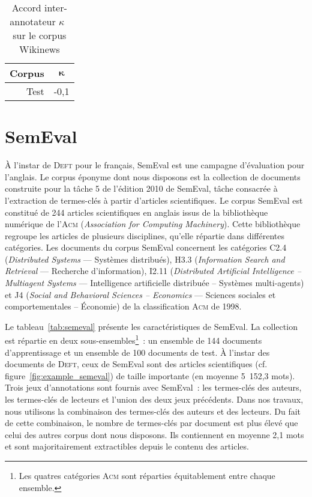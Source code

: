     \begin{table}[!h]
      \centering
      \begin{tabular}{r|c}
        \toprule
        \textbf{Corpus} & $\boldsymbol{\kappa}$\\
        \hline
        Test & -0,1\\
        \bottomrule
      \end{tabular}

      \caption{Accord inter-annotateur $\kappa$~\cite{fleiss1971kappa} sur le
               corpus Wikinews
               \label{tab:wikinews_kappa}}
    \end{table}


  \section[SemEval]{SemEval~\textnormal{\large\cite{kim2010semeval}}}
  \label{sec:main-data_description-semeval_data}
    À l'instar de \textsc{Deft} pour le français, SemEval est une campagne
    d'évaluation pour l'anglais. Le corpus éponyme dont nous disposons est la
    collection de documents construite pour la tâche 5 de l'édition 2010 de
    SemEval, tâche consacrée à l'extraction de termes-clés à partir d'articles
    scientifiques. Le corpus SemEval est constitué de 244 articles scientifiques
    en anglais issus de la bibliothèque numérique de l'\textsc{Acm}
    (\textit{Association for Computing Machinery}). Cette bibliothèque regroupe
    les articles de plusieurs disciplines, qu'elle répartie dans différentes
    catégories. Les documents du corpus SemEval concernent les catégories C2.4
    (\textit{Distributed Systems} --- Systèmes distribués), H3.3
    (\textit{Information Search and Retrieval} --- Recherche d'information),
    I2.11 (\textit{Distributed Artificial Intelligence -- Multiagent Systems}
    --- Intelligence artificielle distribuée -- Systèmes multi-agents) et J4
    (\textit{Social and Behavioral Sciences -- Economics} --- Sciences sociales
    et comportementales -- Économie) de la classification \textsc{Acm} de 1998.
    
    Le tableau~\ref{tab:semeval} présente les caractéristiques de SemEval. La
    collection est répartie en deux sous-ensembles\footnote{Les quatres
    catégories \textsc{Acm} sont réparties équitablement entre chaque
    ensemble.}~: un ensemble de 144 documents d'apprentissage et un ensemble de
    100 documents de test. À l'instar des documents de \textsc{Deft}, ceux de
    SemEval sont des articles scientifiques (cf.
    figure~\ref{fig:example_semeval}) de taille importante (en moyenne 5~152,3
    mots). Trois jeux d'annotations sont fournis avec SemEval~: les termes-clés
    des auteurs, les termes-clés de lecteurs et l'union des deux jeux
    précédents. Dans nos travaux, nous utilisons la combinaison des termes-clés
    des auteurs et des lecteurs. Du fait de cette combinaison, le nombre de
    termes-clés par document est plus élevé que celui des autres corpus dont
    nous disposons. Ils contiennent en moyenne 2,1 mots et sont majoritairement
    extractibles depuis le contenu des articles.

